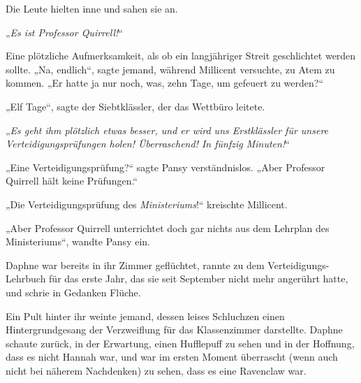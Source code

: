 Die Leute hielten inne und sahen sie an.

„\emph{Es ist Professor Quirrell!}“

Eine plötzliche Aufmerksamkeit, als ob ein langjähriger Streit geschlichtet werden sollte.
„Na, endlich“, sagte jemand, während Millicent versuchte, zu Atem zu kommen.
„Er hatte ja nur noch, was, zehn Tage, um gefeuert zu werden?“

„Elf Tage“, sagte der Siebtklässler, der das Wettbüro leitete.

„\emph{Es geht ihm plötzlich etwas besser, und er wird uns Erstklässler für unsere Verteidigungsprüfungen holen! Überraschend! In fünfzig Minuten!}“

„Eine Verteidigungsprüfung?“ sagte Pansy verständnislos.
„Aber Professor Quirrell hält keine Prüfungen.“

„Die Verteidigungsprüfung des \emph{Ministeriums}!“ kreischte Millicent.

„Aber Professor Quirrell unterrichtet doch gar nichts aus dem Lehrplan des Ministeriums“, wandte Pansy ein.

Daphne war bereits in ihr Zimmer geflüchtet, rannte zu dem Verteidigungs-Lehrbuch für das erste Jahr, das sie seit September nicht mehr angerührt hatte, und schrie in Gedanken Flüche.

\later

Ein Pult hinter ihr weinte jemand, dessen leises Schluchzen einen Hintergrundgesang der Verzweiflung für das Klassenzimmer darstellte. Daphne schaute zurück, in der Erwartung, einen Hufflepuff zu sehen und in der Hoffnung, dass es nicht Hannah war, und war im ersten Moment überrascht (wenn auch nicht bei näherem Nachdenken) zu sehen, dass es eine Ravenclaw war.

